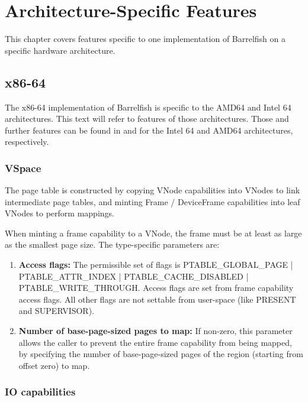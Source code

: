 \documentclass[a4paper,11pt,twoside]{report}
\begin{document}
\chapter{Architecture-Specific Features}\label{apx:arch_specific}

This chapter covers features specific to one implementation of
Barrelfish on a specific hardware architecture.

\section{x86-64}

The x86-64 implementation of Barrelfish is specific to the AMD64
and Intel 64 architectures. This text will refer to features of
those architectures. Those and further features can be found in
\cite{intelsa} and \cite{amdsa} for the Intel 64 and AMD64
architectures, respectively.

\subsection{VSpace}

The page table is constructed by copying VNode capabilities into VNodes to
link intermediate page tables, and minting Frame / DeviceFrame capabilities
into leaf VNodes to perform mappings.

When minting a frame capability to a
VNode, the frame must be at least as large as the smallest page size. The
type-specific parameters are:

\begin{enumerate}
  \item \textbf{Access flags:}
    The permissible set of flags is PTABLE\_GLOBAL\_PAGE
    | PTABLE\_ATTR\_INDEX | PTABLE\_CACHE\_DISABLED |
    PTABLE\_WRITE\_THROUGH. Access flags are set from frame capability
    access flags. All other flags are not settable from user-space (like
    PRESENT and SUPERVISOR).

  \item \textbf{Number of base-page-sized pages to map:} If non-zero, this
    parameter allows the caller to prevent the entire frame capability from
    being mapped, by specifying the number of base-page-sized pages
    of the region (starting from offset zero) to map.
\end{enumerate}

\subsection{IO capabilities}
\end{document}
